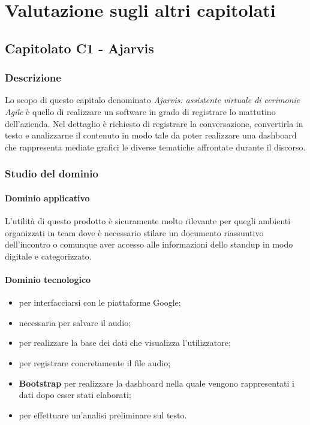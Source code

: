 \section{Valutazione sugli altri capitolati}
	\subsection{Capitolato C1 - Ajarvis}
		\subsubsection{Descrizione}
	    Lo scopo di questo capitalo denominato \emph{Ajarvis: assistente virtuale di cerimonie Agile} è quello di realizzare un software in grado di registrare lo  mattutino dell'azienda. Nel dettaglio è richiesto di registrare la conversazione, convertirla in testo e analizzarne il contenuto in modo tale da poter realizzare una dashboard che rappresenta mediate grafici le diverse tematiche affrontate durante il discorso.  
		\subsubsection{Studio del dominio}
			\paragraph{Dominio applicativo} \Spazio
			 L'utilità di questo prodotto è sicuramente molto rilevante per quegli ambienti organizzati in team dove è necessario stilare un documento riassuntivo dell'incontro o comunque aver accesso alle informazioni dello standup in modo digitale e categorizzato.
			\paragraph{Dominio tecnologico}
			\begin{itemize}
				\item \textbf{} per interfacciarsi con le piattaforme Google;
				\item  \textbf{} necessaria per salvare il  audio; 
				\item  \textbf{} per realizzare la base dei dati che visualizza l'utilizzatore;
				\item  \textbf{} per registrare concretamente il file audio;
				\item  \textbf{ Bootstrap} per realizzare la dashboard nella quale vengono rappresentati i dati dopo esser stati elaborati;
				\item  \textbf{} per effettuare un'analisi preliminare sul testo.	
			\end{itemize}
			
